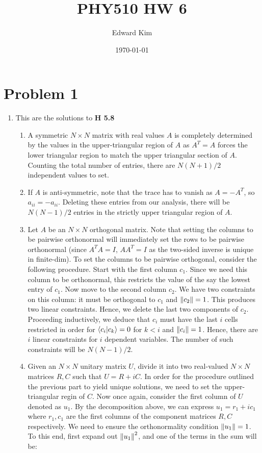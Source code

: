 \documentclass[12pt]{article}%
\title{PHY510 HW 6}
\author{Edward Kim}
\date{\today}
\begin{document}
\maketitle

\section{Problem 1}
\begin{enumerate}
  \item
  This are the solutions to \textbf{H 5.8}
  \begin{enumerate}
    \item A symmetric $N \times N$ matrix with real values $A$ is completely determined by the values in the upper-triangular region of $A$ as $A^T = A$ forces the lower triangular region to match the upper triangular section of $A$. Counting the total number of entries, there are $N(N+1)/2$ independent values to set.

    \item If $A$ is anti-symmetric, note that the trace has to vanish as $A = -A^T$, so $a_{ii} = - a_{ii}$. Deleting these entries from our analysis, there will be $N(N-1)/2$ entries in the strictly upper triangular region of $A$.

    \item Let $A$ be an $N \times N$ orthogonal matrix. Note that setting the columns to be pairwise orthonormal will immediately set the rows to be pairwise orthonormal (since $A^TA = I$, $AA^T = I$ as the two-sided inverse is unique in finite-dim). To set the columns to be pairwise orthogonal, consider the following procedure. Start with the first column $c_1$. Since we need this column to be orthonormal, this restricts the value of the say the lowest entry of $c_1$. Now move to the second column $c_2$. We have two constraints on this column: it must be orthogonal to $c_1$ and $\norm{c_2} = 1$. This produces two linear constraints. Hence, we delete the last two components of $c_2$. Proceeding inductively, we deduce that $c_i$ must have the last $i$ cells restricted in order for $\ip{c_i}{c_k} = 0$ for $k < i$ and $\norm{c_i} = 1$. Hence, there are $i$ linear constraints for $i$ dependent variables. The number of such constraints will be $N(N-1)/2$.

    \item
    Given an $N \times N$ unitary matrix $U$, divide it into two real-valued $N \times N$ matrices $R,C$ such that $U = R + iC$. In order for the procedure outlined the previous part to yield unique solutions, we need to set the upper-triangular regin of $C$. Now once again, consider the first column of $U$ denoted as $u_1$. By the decomposition above, we can express $u_1 = r_1 + i c_1$ where $r_1,c_1$ are the first columns of the component matrices $R,C$ respectively. We need to ensure the orthonormality condition $\norm{u_1} = 1$. To this end, first expand out $\norm{u_1}^2$, and one of the terms in the sum will be:


\end{enumerate}
\end{enumerate}
\end{document}
